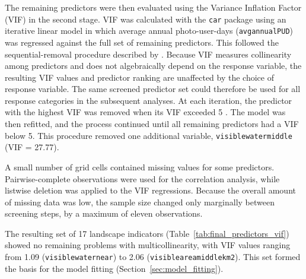 \documentclass[11pt]{article}
\renewcommand{\_}{\textunderscore\allowbreak{}}
\begin{document}
The remaining predictors were then evaluated using the Variance Inflation Factor (VIF) in the second stage. VIF was calculated with the \texttt{car} package \citep{fox2018} using an iterative linear model in which average annual photo-user-days (\texttt{avg\_annual\_PUD}) was regressed against the full set of remaining predictors. This followed the sequential-removal procedure described by \citet{zuur2010}. Because VIF measures collinearity among predictors and does not algebraically depend on the response variable, the resulting VIF values and predictor ranking are unaffected by the choice of response variable. The same screened predictor set could therefore be used for all response categories in the subsequent analyses. At each iteration, the predictor with the highest VIF was removed when its VIF exceeded 5 \citep{vaz_digital_2020}. The model was then refitted, and the process continued until all remaining predictors had a VIF below 5. This procedure removed one additional variable, \texttt{visible\_water\_middle} (VIF = 27.77). 

A small number of grid cells contained missing values for some predictors. Pairwise-complete observations were used for the correlation analysis, while listwise deletion was applied to the VIF regressions. Because the overall amount of missing data was low, the sample size changed only marginally between screening steps, by a maximum of eleven observations.

The resulting set of 17 landscape indicators (Table~\ref{tab:final_predictors_vif}) showed no remaining problems with multicollinearity, with VIF values ranging from 1.09 (\texttt{visible\_water\_near}) to 2.06 (\texttt{visible\_area\_middle\_km2}). This set formed the basis for the model fitting (Section~\ref{sec:model_fitting}).
\end{document}
